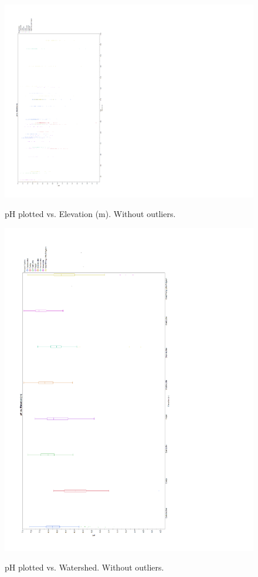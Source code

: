 \documentclass[11pt]{article} %
\begin{document}
\begin{figure}[h!]
  \caption{pH plotted vs. Elevation (m).  Without outliers.}
   \includegraphics[width=11 in,clip=true,trim=0 30 150 40]{CAgraph9}\\
\label{fig:figure9}
\end{figure}
\pagebreak

\begin{figure}[h!]
  \caption{pH plotted vs. Watershed.  Without outliers.}
   \includegraphics[width=6in,clip=true,trim=0 20 150 75]{CAgraph10}\\
\label{fig:figure10}
\end{figure}
\pagebreak
\end{document}
